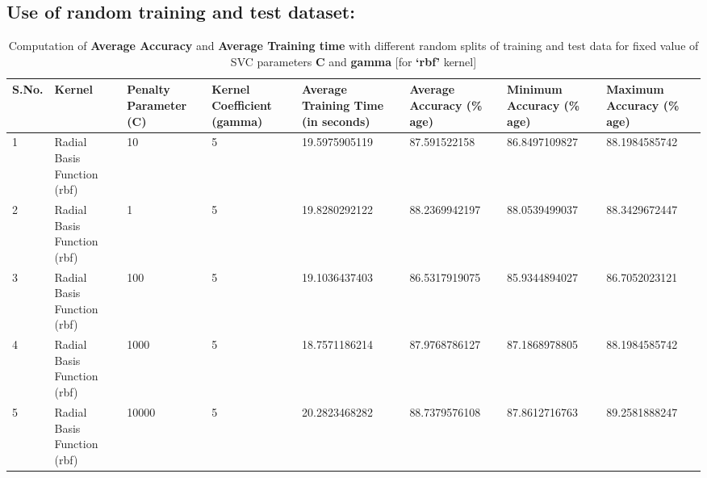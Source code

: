 \documentclass{report}
\begin{document}
\subsection{\LARGE Use of random training and test dataset:}
\begin{table}[!h]
\centering
\begin{tabular}{|p{0.7cm}|p{1.5cm}|p{1.8cm}|p{1.9cm}|p{2.3cm}|p{2.3cm}|p{2.3cm}|p{2.3cm}|}
\hline
\textbf{S.No.} & \textbf{Kernel}             & \textbf{Penalty Parameter (C)} & \textbf{Kernel Coefficient (gamma)} & \textbf{Average Training \linebreak Time \linebreak (in seconds)} & \textbf{Average \linebreak Accuracy \linebreak (\% age)} & \textbf{Minimum \linebreak Accuracy \linebreak (\% age)} & \textbf{Maximum \linebreak Accuracy \linebreak (\% age)} \\ \hline
1              & Radial Basis Function (rbf) & 10                              & 5                                   & 19.5975905119                               & 87.591522158                       & 86.8497109827                     & 88.1984585742                     \\ \hline
2              & Radial Basis Function (rbf) & 1                               & 5                                   & 19.8280292122                               & 88.2369942197                      & 88.0539499037                     & 88.3429672447                     \\ \hline
3              & Radial Basis Function (rbf) & 100                             & 5                                   & 19.1036437403                               & 86.5317919075                      & 85.9344894027                     & 86.7052023121                     \\ \hline
4              & Radial Basis Function (rbf) & 1000                            & 5                                   & 18.7571186214                               & 87.9768786127                      & 87.1868978805                     & 88.1984585742                     \\ \hline
5              & Radial Basis Function (rbf) & 10000                           & 5                                   & 20.2823468282                               & 88.7379576108                      & 87.8612716763                     & 89.2581888247                     \\ \hline
\end{tabular}
\caption{Computation of \textbf{Average Accuracy} and \textbf{Average Training time} with different random splits of training and test data for fixed value of SVC parameters \textbf{C} and \textbf{gamma} [for \textbf{‘rbf’} kernel]}
\label{my-table}
\end{table}
\end{document}
